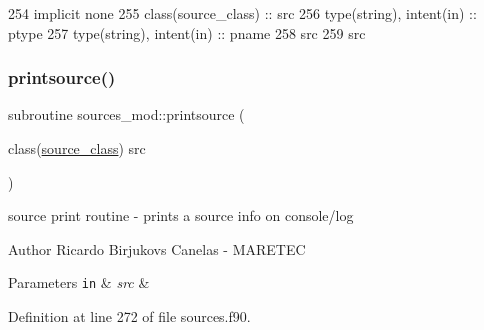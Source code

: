 \begin{DoxyCode}
254     \textcolor{keywordtype}{implicit none}
255     \textcolor{keywordtype}{class}(source\_class) :: src
256     \textcolor{keywordtype}{type}(string), \textcolor{keywordtype}{intent(in)} :: ptype
257     \textcolor{keywordtype}{type}(string), \textcolor{keywordtype}{intent(in)} :: pname
258     src%
259     src%
\end{DoxyCode}
\mbox{\label{namespacesources__mod_a641fe9ecc295e486a714c1aaa133d991}} 
\subsubsection{\texorpdfstring{printsource()}{printsource()}}
{\footnotesize\ttfamily subroutine sources\+\_\+mod\+::printsource (\begin{DoxyParamCaption}\item[{class(\mbox{\hyperlink{structsources__mod_1_1source__class}{source\+\_\+class}})}]{src }\end{DoxyParamCaption})\hspace{0.3cm}{\ttfamily [private]}}



source print routine -\/ prints a source info on console/log 

\begin{DoxyAuthor}{Author}
Ricardo Birjukovs Canelas -\/ M\+A\+R\+E\+T\+EC
\end{DoxyAuthor}

\begin{DoxyParams}[1]{Parameters}
\mbox{\tt in}  & {\em src} & \\
\hline
\end{DoxyParams}


Definition at line 272 of file sources.\+f90.


